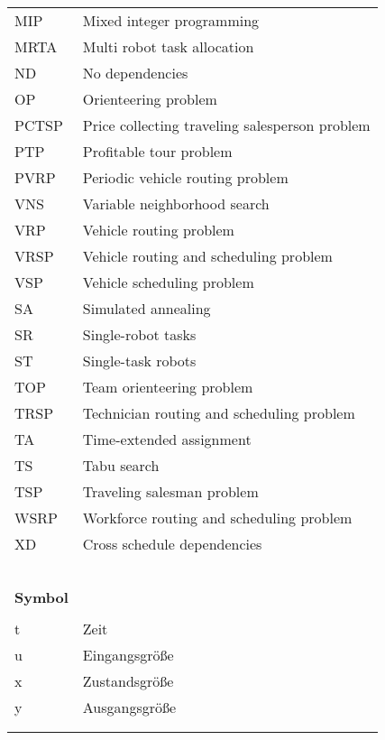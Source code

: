 \begin{supertabular*}{\textwidth}{ll}
MIP							& 	Mixed integer programming \\
MRTA						& 	Multi robot task allocation \\
ND							&   No dependencies \\
OP							&   Orienteering problem \\
PCTSP						&   Price collecting traveling salesperson problem \\
PTP							&   Profitable tour problem \\
PVRP						&   Periodic vehicle routing problem \\
VNS							& 	Variable neighborhood search \\
VRP 						& 	Vehicle routing problem \\
VRSP						&   Vehicle routing and scheduling problem \\
VSP							&   Vehicle scheduling problem \\
SA							&   Simulated annealing \\
SR							&   Single-robot tasks \\
ST							&   Single-task robots \\
TOP							&   Team orienteering problem \\
TRSP						&   Technician routing and scheduling problem \\
TA							&   Time-extended assignment \\
TS							& 	Tabu search \\
TSP 						&   Traveling salesman problem \\
WSRP						& 	Workforce routing and scheduling problem \\
XD							&	Cross schedule dependencies \\
\\
\\
\\
 \\
\\
\hline 
{\bf Symbol}					&		{\bf {}} \\
\hline
\\
t            					& 	Zeit \\
u          						&  	Eingangsgröße \\
x											& 	Zustandsgröße \\
y											&		Ausgangsgröße \\
\\
\\

\end{supertabular*}
